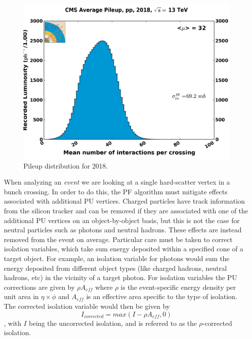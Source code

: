 \begin{figure}[h]
	\centering
	\includegraphics[width=0.9\linewidth]{Figures/pileup_pp_2018_69200}
	\caption[Pileup distribution for 2018]{Pileup distribution for 2018.}
	\label{fig:pileuppp201869200}
\end{figure}

When analyzing an \textit{event} we are looking at a single hard-scatter vertex in a bunch crossing.  In order to do this, the PF algorithm must mitigate effects associated with additional PU vertices.  Charged particles have track information from the silicon tracker and can be removed if they are associated with one of the additional PU vertices on an object-by-object basis, but this is not the case for neutral particles such as photons and neutral hadrons.  These effects are instead removed from the event on average.  Particular care must be taken to correct isolation variables, which take sum energy deposited within a  specified cone of a target object.  For example, an isolation variable for photons would sum the energy deposited from different object types (like charged hadrons, neutral hadrons, etc) in the vicinity of a target photon.  For isolation variables the PU corrections are given by $\rho A_{eff}$ where $\rho$ is the event-specific energy density per unit area in $\eta \times \phi$ and $A_{eff}$ is an effective area specific to the type of isolation.  The corrected isolation variable would then be given by
\begin{equation}
	I_{corrected} = max(I - \rho A_{eff}, 0) 
\end{equation}
, with $I$ being the uncorrected isolation, and is referred to as the $\rho$-corrected isolation.
\label{section:pucorrection}


